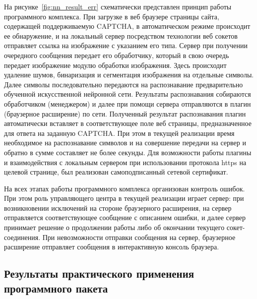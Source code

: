 \documentclass[a4paper,12pt,russian]{article} %
\begin{document}
На рисунке~\ref{fig:nn_result_err} схематически представлен принцип работы программного комплекса.
При загрузке в веб браузере страницы сайта, содержащей поддерживаемую CAPTCHA, в автоматическом режиме происходит ее обнаружение, и на локальный сервер посредством технологии веб сокетов отправляет ссылка на изображение с указанием его типа.
Сервер при получении очередного сообщения передает его обработчику, который в свою очередь передает изображение модулю обработки изображения.
Здесь происходит удаление шумов, бинаризация и сегментация изображения на отдельные символы.
Далее символы последовательно передаются на распознавание предварительно обученной искусственной нейронной сети.
Результаты распознавания собираются обработчиком (менеджером) и далее при помощи сервера отправляются в плагин (браузерное расширение) по сети.
Полученный результат распознавания плагин автоматически вставляет в соответствующее поле веб страницы, предназначенное для ответа на заданную CAPTCHA.
При этом в текущей реализации время необходимое на распознавание символов и на совершение передачи на сервер и обратно в сумме составляет не более секунды.
Для возможности работы плагины и взаимодействия с локальным сервером при использовании протокола https на целевой странице, был реализован самоподписанный сетевой сертификат.

На всех этапах работы программного комплекса организован контроль ошибок.
При этом роль управляющего центра в текущей реализации играет сервер: при возникновении исключений на стороне браузерного расширения, на сервер отправляется соответствующее сообщение с описанием ошибки, и далее сервер принимает решение о продолжении работы либо об окончании текущего сокет-соединения.
При невозможности отправки сообщения на сервер, браузерное расширение отправляет сообщения в интерактивную консоль браузера.

\newpage
\subsection{Результаты практического применения программного пакета} \label{ss:soft_results}
\end{document}
